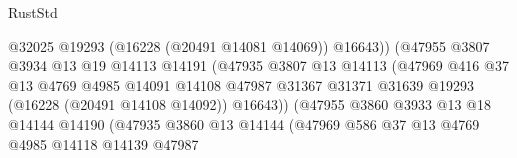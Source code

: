 \begin{lexlean}{RustStd}
\begin{coremodule}
                                            @32025
                                            @19293
                                            (@16228 (@20491 @14081 @14069))
                                            @16643))
                                        (@47955
                                          @3807
                                          @3934
                                          @13
                                          @19
                                          @14113
                                          @14191
                                          (@47935
                                            @3807
                                            @13
                                            @14113
                                            (@47969
                                              @416
                                              @37
                                              @13
                                              @4769
                                              @4985
                                              @14091
                                              @14108
                                              @47987
                                              @31367
                                              @31371
                                              @31639
                                              @19293
                                              (@16228 (@20491 @14108 @14092))
                                              @16643))
                                          (@47955
                                            @3860
                                            @3933
                                            @13
                                            @18
                                            @14144
                                            @14190
                                            (@47935
                                              @3860
                                              @13
                                              @14144
                                              (@47969
                                                @586
                                                @37
                                                @13
                                                @4769
                                                @4985
                                                @14118
                                                @14139
                                                @47987

\end{coremodule}
\end{lexlean}
